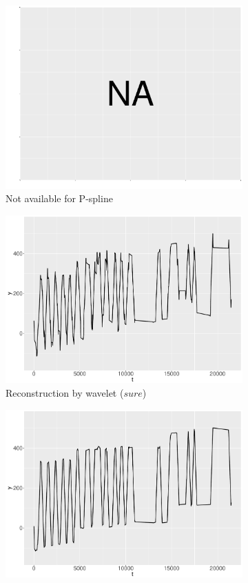 \begin{figure}
    \centering
    \begin{subfigure}{0.45\textwidth}
    \centering
    \includegraphics[width=\linewidth,height=0.5\textwidth]{Chapters/02TractorSplineTheory/plot/ggplot/NA.pdf}
    \caption{Not available for P-spline}\label{ggRealdataYPSpline}
    \end{subfigure}%
    \begin{subfigure}{0.45\textwidth}
    \centering
    \includegraphics[width=\linewidth,height=0.5\textwidth]{Chapters/02TractorSplineTheory/plot/ggplot/ggRealdataYSure.pdf}
    \caption{Reconstruction by wavelet ($\textit{sure}$)}\label{ggRealdataYSure}
    \end{subfigure}
    \begin{subfigure}{0.45\textwidth}
    \centering
    \includegraphics[width=\linewidth,height=0.5\textwidth]{Chapters/02TractorSplineTheory/plot/ggplot/ggRealdataYBayes.pdf}

\end{subfigure}
\end{figure}
